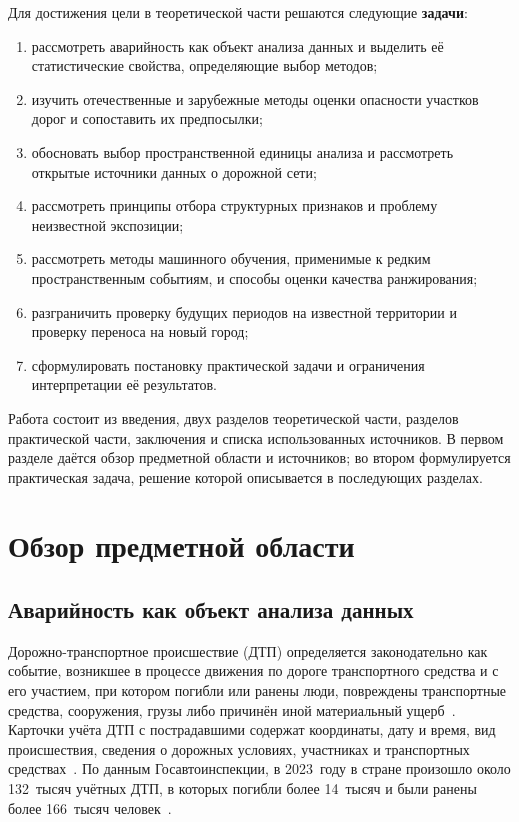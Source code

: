\documentclass[coursework]{SCWorks}
\begin{document}
Для достижения цели в теоретической части решаются следующие
\textbf{задачи}:
\begin{enumerate}
  \item рассмотреть аварийность как объект анализа данных и выделить
        её статистические свойства, определяющие выбор методов;
  \item изучить отечественные и зарубежные методы оценки опасности
        участков дорог и сопоставить их предпосылки;
  \item обосновать выбор пространственной единицы анализа и
        рассмотреть открытые источники данных о дорожной сети;
  \item рассмотреть принципы отбора структурных признаков и проблему
        неизвестной экспозиции;
  \item рассмотреть методы машинного обучения, применимые к редким
        пространственным событиям, и способы оценки качества
        ранжирования;
  \item разграничить проверку будущих периодов на известной территории
        и проверку переноса на новый город;
  \item сформулировать постановку практической задачи и ограничения
        интерпретации её результатов.
\end{enumerate}

Работа состоит из введения, двух разделов теоретической части,
разделов практической части, заключения и списка использованных
источников. В первом разделе даётся обзор предметной области и
источников; во втором формулируется практическая задача, решение которой
описывается в последующих разделах.

\section{Обзор предметной области}

\subsection{Аварийность как объект анализа данных}

Дорожно-транспортное происшествие (ДТП) определяется законодательно как
событие, возникшее в процессе движения по дороге транспортного средства и
с его участием, при котором погибли или ранены люди, повреждены
транспортные средства, сооружения, грузы либо причинён иной материальный
ущерб~\cite{fz196}. Карточки учёта ДТП с пострадавшими содержат координаты,
дату и время, вид происшествия, сведения о дорожных условиях,
участниках и транспортных средствах~\cite{odm2015}. По данным
Госавтоинспекции, в 2023~году в
стране произошло около 132~тысяч учётных ДТП, в которых погибли более
14~тысяч и были ранены более 166~тысяч человек~\cite{gibddstat}.
\end{document}
